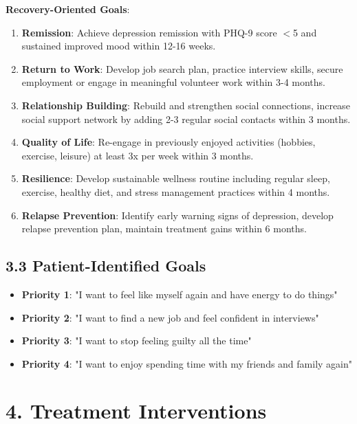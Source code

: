 \documentclass[11pt,letterpaper]{article}
\begin{document}
\textbf{Recovery-Oriented Goals}:
\begin{enumerate}[leftmargin=*]
    \item \textbf{Remission}: Achieve depression remission with PHQ-9 score $<$5 and sustained improved mood within 12-16 weeks.
    
    \item \textbf{Return to Work}: Develop job search plan, practice interview skills, secure employment or engage in meaningful volunteer work within 3-4 months.
    
    \item \textbf{Relationship Building}: Rebuild and strengthen social connections, increase social support network by adding 2-3 regular social contacts within 3 months.
    
    \item \textbf{Quality of Life}: Re-engage in previously enjoyed activities (hobbies, exercise, leisure) at least 3x per week within 3 months.
    
    \item \textbf{Resilience}: Develop sustainable wellness routine including regular sleep, exercise, healthy diet, and stress management practices within 4 months.
    
    \item \textbf{Relapse Prevention}: Identify early warning signs of depression, develop relapse prevention plan, maintain treatment gains within 6 months.
\end{enumerate}

\subsection*{3.3 Patient-Identified Goals}

\begin{itemize}[leftmargin=*]
    \item \textbf{Priority 1}: "I want to feel like myself again and have energy to do things"
    \item \textbf{Priority 2}: "I want to find a new job and feel confident in interviews"
    \item \textbf{Priority 3}: "I want to stop feeling guilty all the time"
    \item \textbf{Priority 4}: "I want to enjoy spending time with my friends and family again"
\end{itemize}

\section*{4. Treatment Interventions}
\end{document}
